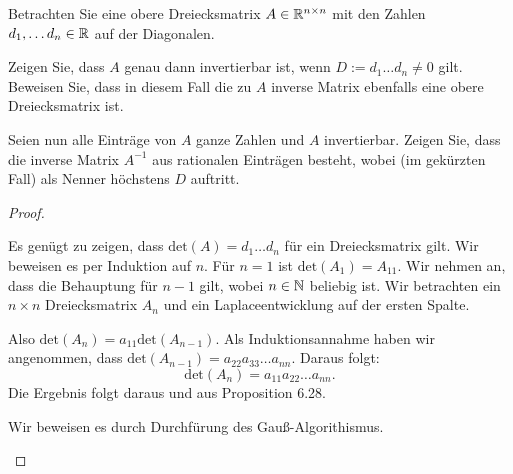 \begin{Problem}
	Betrachten Sie eine obere Dreiecksmatrix $A\in \mathbb{R}^{n\times n}$ mit den Zahlen $d_1,\dots d_n\in \mathbb{R}$ auf der Diagonalen.
	\begin{parts}
		\item Zeigen Sie, dass $A$ genau dann invertierbar ist, wenn $D:= d_1\dots d_n\neq 0$ gilt. Beweisen Sie, dass in diesem Fall die zu $A$ inverse Matrix ebenfalls eine obere Dreiecksmatrix ist.
		\item  Seien nun alle Einträge von $A$ ganze Zahlen und $A$ invertierbar. Zeigen Sie, dass die inverse Matrix $A^{-1}$ aus rationalen Einträgen besteht, wobei (im gekürzten Fall) als Nenner höchstens $D$ auftritt.
	\end{parts}
\end{Problem}
\begin{proof}
	\begin{parts}
	\item Es genügt zu zeigen, dass $\text{det}(A)=d_1\dots d_n$ f\"{u}r ein Dreiecksmatrix gilt. Wir beweisen es per Induktion auf $n$. F\"{u}r $n=1$ ist $\text{det}(A_1)=A_{11}$. Wir nehmen an, dass die Behauptung f\"{u}r $n-1$ gilt, wobei $n\in \mathbb{N}$ beliebig ist. Wir betrachten ein $n\times n$ Dreiecksmatrix $A_n$ und ein Laplaceentwicklung auf der ersten Spalte.
		\begin{center}
		\end{center}
		Also $\text{det}(A_n)=a_{11}\text{det}(A_{n-1})$. Als Induktionsannahme haben wir angenommen, dass $\text{det}(A_{n-1})=a_{22}a_{33}\dots a_{nn}$. Daraus folgt:
		\[
			\text{det}(A_n)=a_{11}a_{22}\dots a_{nn}
		.\] 
		Die Ergebnis folgt daraus und aus Proposition 6.28.
	\item Wir beweisen es durch Durchfürung des Gauß-Algorithismus.


\end{parts}
\end{proof}

